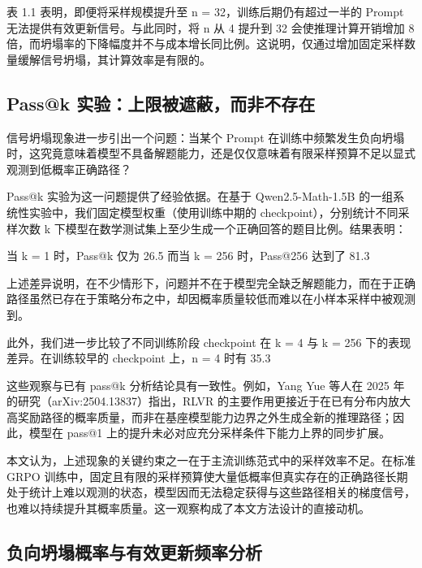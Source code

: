 表 1.1 表明，即便将采样规模提升至 n = 32，训练后期仍有超过一半的 Prompt 无法提供有效更新信号。与此同时，将 n 从 4 提升到 32 会使推理计算开销增加 8 倍，而坍塌率的下降幅度并不与成本增长同比例。这说明，仅通过增加固定采样数量缓解信号坍塌，其计算效率是有限的。

\subsection{Pass@k 实验：上限被遮蔽，而非不存在}

信号坍塌现象进一步引出一个问题：当某个 Prompt 在训练中频繁发生负向坍塌时，这究竟意味着模型不具备解题能力，还是仅仅意味着有限采样预算不足以显式观测到低概率正确路径？

Pass@k 实验为这一问题提供了经验依据。在基于 Qwen2.5-Math-1.5B 的一组系统性实验中，我们固定模型权重（使用训练中期的 checkpoint），分别统计不同采样次数 k 下模型在数学测试集上至少生成一个正确回答的题目比例。结果表明：

当 k = 1 时，Pass@k 仅为 26.5%
而当 k = 256 时，Pass@256 达到了 81.3%

上述差异说明，在不少情形下，问题并不在于模型完全缺乏解题能力，而在于正确路径虽然已存在于策略分布之中，却因概率质量较低而难以在小样本采样中被观测到。

此外，我们进一步比较了不同训练阶段 checkpoint 在 k = 4 与 k = 256 下的表现差异。在训练较早的 checkpoint 上，n = 4 时有 35.3%

这些观察与已有 pass@k 分析结论具有一致性。例如，Yang Yue 等人在 2025 年的研究（arXiv:2504.13837）指出，RLVR 的主要作用更接近于在已有分布内放大高奖励路径的概率质量，而非在基座模型能力边界之外生成全新的推理路径；因此，模型在 pass@1 上的提升未必对应充分采样条件下能力上界的同步扩展。

本文认为，上述现象的关键约束之一在于主流训练范式中的采样效率不足。在标准 GRPO 训练中，固定且有限的采样预算使大量低概率但真实存在的正确路径长期处于统计上难以观测的状态，模型因而无法稳定获得与这些路径相关的梯度信号，也难以持续提升其概率质量。这一观察构成了本文方法设计的直接动机。

\subsection{负向坍塌概率与有效更新频率分析}

